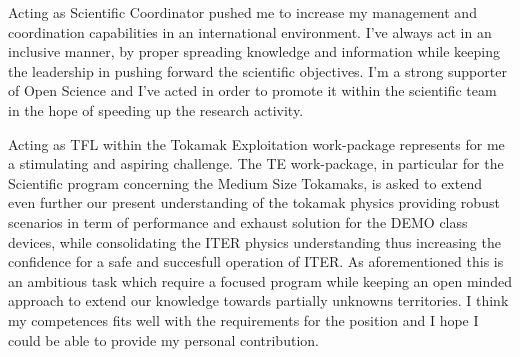 \documentclass[12pt,a4paper,sans]{moderncv}        %
\begin{document}
Acting as Scientific Coordinator pushed me to increase my  management and coordination capabilities in an
international environment. I've always act in an inclusive
manner, by proper spreading knowledge and information while keeping
the leadership in pushing forward the scientific objectives. I'm a
strong supporter of Open Science and I've acted in order to promote it
within the scientific team in the hope of speeding up the research activity.

Acting as TFL within the Tokamak Exploitation work-package represents
for me a stimulating and aspiring challenge. The TE work-package, in
particular for the Scientific program concerning the Medium Size
Tokamaks, is asked to extend even further our present understanding of
the tokamak physics providing robust scenarios in term of performance
and exhaust solution for the DEMO class devices, while consolidating
the ITER physics understanding thus increasing the confidence for a
safe and succesfull operation of ITER. As aforementioned this is an
ambitious task which require a focused program while keeping an open
minded approach to extend our knowledge towards partially unknowns
territories. I think my competences fits well with the requirements
for the position and I hope I could be able to provide my personal contribution.


\makeletterclosing
\end{document}
